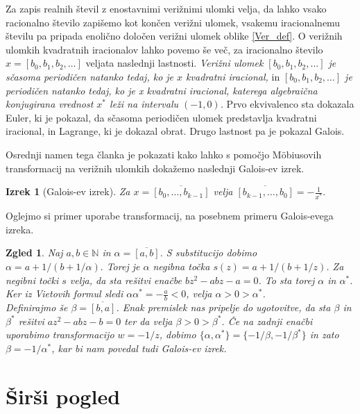 \documentclass[a4paper,12pt]{article}
\def\N{\mathbb{N}} %
\newtheorem{izrek}{Izrek}
\newtheorem{zgled}{Zgled}
\begin{document}
Za zapis realnih števil z enostavnimi verižnimi ulomki velja, da lahko vsako racionalno število zapišemo kot končen verižni ulomek, vsakemu iracionalnemu številu pa pripada enolično določen verižni ulomek oblike \eqref{Ver_def}. O verižnih ulomkih kvadratnih iracionalov lahko povemo še več, za iracionalno število $x = [b_0, b_1, b_2, \ldots]$ veljata naslednji lastnosti. \emph{Verižni ulomek $[b_0, b_1, b_2, \ldots]$ je sčasoma periodičen natanko tedaj, ko je $x$ kvadratni iracional,} in \emph{$[b_0, b_1, b_2, \ldots]$ je periodičen natanko tedaj, ko je x kvadratni iracional, katerega algebraična konjugirana vrednost $x^*$ leži na intervalu $(-1, 0)$.} Prvo ekvivalenco sta dokazala Euler, ki je pokazal, da sčasoma periodičen ulomek predstavlja kvadratni iracional, in Lagrange, ki je dokazal obrat. Drugo lastnost pa je pokazal Galois.

Osrednji namen tega članka je pokazati kako lahko s pomočjo M\"{o}biusovih transformacij na verižnih ulomkih dokažemo naslednji Galois-ev izrek.

\begin{izrek}[Galois-ev izrek]
	Za $x = \overline{[b_0, \ldots, b_{k-1}]}$ velja $\overline{[b_{k-1}, \ldots, b_0]} = - \frac{1}{x^*}.$
\end{izrek}

Oglejmo si primer uporabe transformacij, na posebnem primeru Galois-evega izreka.

\begin{zgled}
Naj $a, b \in \N$ in $\alpha = \overline{[a, b]}$. S substitucijo dobimo $\alpha = a + 1/(b + 1/\alpha).$ Torej je $\alpha$ negibna točka $s(z) = a + 1/(b + 1/z)$. Za negibni točki $s$ velja, da sta rešitvi enačbe $bz^2 - abz - a = 0$. To sta torej $\alpha$ in $\alpha^*$. Ker iz Vietovih formul sledi $\alpha\alpha^* = - \frac{a}{b} < 0$, velja $\alpha > 0 > \alpha^*$.  \\
Definirajmo še $\beta = \overline{[b, a]}$. Enak premislek nas pripelje do ugotovitve, da sta $\beta$ in $\beta^*$ rešitvi $az^2 - abz - b =0$ ter da velja $\beta > 0 > \beta^*$. Če na zadnji enačbi uporabimo transformacijo $w = - 1 / z$, dobimo $\{\alpha, \alpha^*\} = \{-1/\beta, -1/\beta^*\}$ in zato $\beta = -1/\alpha^*$, kar bi nam povedal tudi Galois-ev izrek.
\end{zgled}




\section{Širši pogled}
\label{sirse}
\end{document}
